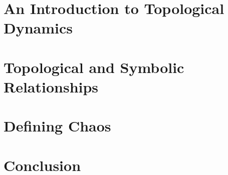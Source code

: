 \documentclass[11pt,a4paper,oneside]{memoir}
\theoremstyle{plain}
\theoremstyle{definition}
\begin{document}
\newpage
\tableofcontents

\chapter{An Introduction to Topological Dynamics} \label{chap:introduction}


\chapter{Topological and Symbolic Relationships} \label{chap:conjugacy-symbol-dynamics}


\chapter{Defining Chaos} \label{chap:defining-chaos}


\chapter{Conclusion} \label{chap:conclusion}



\end{document}
